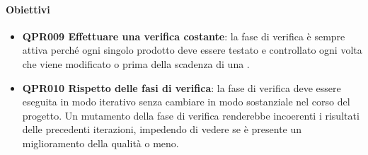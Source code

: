 		\paragraph*{Obiettivi}
		
		\begin{itemize}
			\item \textbf{QPR009 Effettuare una verifica costante}: la fase di verifica è sempre attiva perché ogni singolo prodotto deve essere testato e controllato ogni volta che viene modificato o prima della scadenza di una .
			\item \textbf{QPR010 Rispetto delle fasi di verifica}: la fase di verifica deve essere eseguita in modo iterativo senza cambiare in modo sostanziale nel corso del progetto. Un mutamento della fase di verifica renderebbe incoerenti i risultati delle precedenti iterazioni, impedendo di vedere se è presente un miglioramento della qualità o meno.
		\end{itemize}


